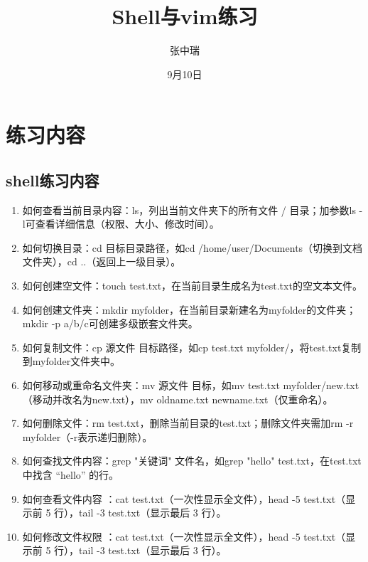 \documentclass[10.5pt]{ctexart}
\title{Shell与vim练习}
\author{张中瑞}
\date{9月10日}
\begin{document}
\maketitle

\section{练习内容}
\subsection{shell练习内容}
\begin{enumerate}
    \item 如何查看当前目录内容：ls，列出当前文件夹下的所有文件 / 目录；加参数ls -l可查看详细信息（权限、大小、修改时间）。
    \item 如何切换目录：cd 目标目录路径，如cd /home/user/Documents（切换到文档文件夹），cd ..（返回上一级目录）。
    \item 如何创建空文件：touch test.txt，在当前目录生成名为test.txt的空文本文件。
    \item 如何创建文件夹：mkdir myfolder，在当前目录新建名为myfolder的文件夹；mkdir -p a/b/c可创建多级嵌套文件夹。
    \item 如何复制文件：cp 源文件 目标路径，如cp test.txt myfolder/，将test.txt复制到myfolder文件夹中。
    \item 如何移动或重命名文件夹：mv 源文件 目标，如mv test.txt myfolder/new.txt（移动并改名为new.txt），mv oldname.txt newname.txt（仅重命名）。
    \item 如何删除文件：rm test.txt，删除当前目录的test.txt；删除文件夹需加rm -r myfolder（-r表示递归删除）。
    \item 如何查找文件内容：grep "关键词" 文件名，如grep "hello" test.txt，在test.txt中找含 “hello” 的行。
    \item 如何查看文件内容 ：cat test.txt（一次性显示全文件），head -5 test.txt（显示前 5 行），tail -3 test.txt（显示最后 3 行）。
    \item 如何修改文件权限 ：cat test.txt（一次性显示全文件），head -5 test.txt（显示前 5 行），tail -3 test.txt（显示最后 3 行）。
    \end{enumerate}
\end{document}
